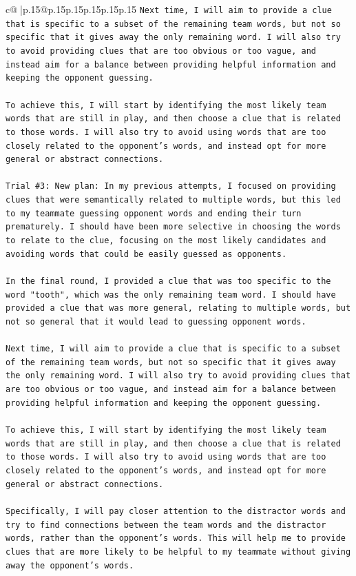 \documentclass{article}
\begin{document}
{\begin{supertabular}{c@{$\;$}|p{.15\linewidth}@{}p{.15\linewidth}p{.15\linewidth}p{.15\linewidth}p{.15\linewidth}p{.15\linewidth}}
{{{\texttt{Next time, I will aim to provide a clue that is specific to a subset of the remaining team words, but not so specific that it gives away the only remaining word. I will also try to avoid providing clues that are too obvious or too vague, and instead aim for a balance between providing helpful information and keeping the opponent guessing. } \\
\\ 
\texttt{To achieve this, I will start by identifying the most likely team words that are still in play, and then choose a clue that is related to those words. I will also try to avoid using words that are too closely related to the opponent's words, and instead opt for more general or abstract connections.} \\
\\ 
\texttt{Trial \#3: New plan: In my previous attempts, I focused on providing clues that were semantically related to multiple words, but this led to my teammate guessing opponent words and ending their turn prematurely. I should have been more selective in choosing the words to relate to the clue, focusing on the most likely candidates and avoiding words that could be easily guessed as opponents. } \\
\\ 
\texttt{In the final round, I provided a clue that was too specific to the word "tooth", which was the only remaining team word. I should have provided a clue that was more general, relating to multiple words, but not so general that it would lead to guessing opponent words. } \\
\\ 
\texttt{Next time, I will aim to provide a clue that is specific to a subset of the remaining team words, but not so specific that it gives away the only remaining word. I will also try to avoid providing clues that are too obvious or too vague, and instead aim for a balance between providing helpful information and keeping the opponent guessing. } \\
\\ 
\texttt{To achieve this, I will start by identifying the most likely team words that are still in play, and then choose a clue that is related to those words. I will also try to avoid using words that are too closely related to the opponent's words, and instead opt for more general or abstract connections. } \\
\\ 
\texttt{Specifically, I will pay closer attention to the distractor words and try to find connections between the team words and the distractor words, rather than the opponent's words. This will help me to provide clues that are more likely to be helpful to my teammate without giving away the opponent's words.} \\
}}}
\end{supertabular}}
\end{document}
